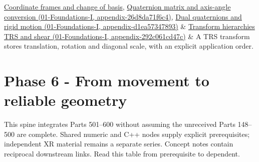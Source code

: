 {\begin{longtable}[]
\hyperref[appendix-1bae9457dbc3]{Coordinate frames and change of basis}, \href{../01-Foundations-I/main.pdf\#nameddest=appendix-26d8da71f6c4}{Quaternion matrix and axis-angle conversion (01-Foundations-I, appendix-26d8da71f6c4)}, \href{../01-Foundations-I/main.pdf\#nameddest=appendix-d1ea57347893}{Dual quaternions and rigid motion (01-Foundations-I, appendix-d1ea57347893)} & \href{../01-Foundations-I/main.pdf\#nameddest=appendix-292c061cd47c}{Transform hierarchies TRS and shear (01-Foundations-I, appendix-292c061cd47c)} & A TRS transform stores translation, rotation and diagonal scale, with an explicit application order. \\
\end{longtable}
}

\section{Phase 6 - From movement to reliable geometry}\label{appendix-4ad47bdd269a-phase-6---from-movement-to-reliable-geometry}

This spine integrates Parts 501--600 without assuming the unreceived Parts 148--500 are complete. Shared numeric and C++ nodes supply explicit prerequisites; independent XR material remains a separate series. Concept notes contain reciprocal downstream links. Read this table from prerequisite to dependent.

